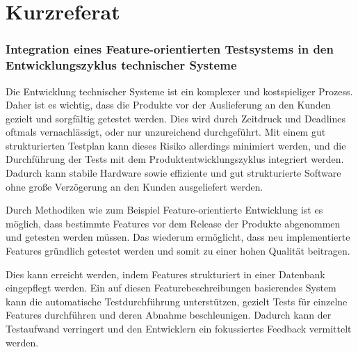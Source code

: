 \chapter*{Kurzreferat}

\subsection*{Integration eines Feature-orientierten Testsystems in den Entwicklungszyklus technischer Systeme}

Die Entwicklung technischer Systeme ist ein komplexer und kostspieliger Prozess. Daher ist es wichtig, dass die Produkte vor der Auslieferung an den Kunden gezielt und sorgfältig getestet werden. Dies wird durch Zeitdruck und Deadlines oftmals vernachlässigt, oder nur unzureichend durchgeführt. Mit einem gut strukturierten Testplan kann dieses Risiko allerdings minimiert werden, und die Durchführung der Tests mit dem Produktentwicklungszyklus integriert werden. Dadurch kann stabile Hardware sowie effiziente und gut strukturierte Software ohne große Verzögerung an den Kunden ausgeliefert werden.

\smallskip

Durch Methodiken wie zum Beispiel Feature-orientierte Entwicklung ist es möglich, dass bestimmte Features vor dem Release der Produkte abgenommen und getesten werden müssen. Das wiederum ermöglicht, dass neu implementierte Features gründlich getestet werden und somit zu einer hohen Qualität beitragen.

\smallskip

Dies kann erreicht werden, indem Features strukturiert in einer Datenbank eingepflegt werden. Ein auf diesen Featurebeschreibungen basierendes System kann die automatische Testdurchführung unterstützen, gezielt Tests für einzelne Features durchführen und deren Abnahme beschleunigen. Dadurch kann der Testaufwand verringert und den Entwicklern ein fokussiertes Feedback vermittelt werden.

\clearpage